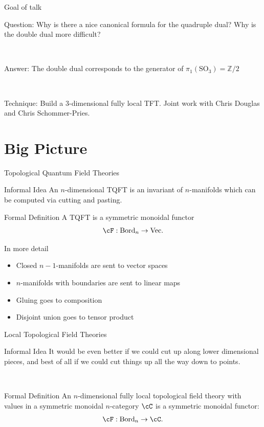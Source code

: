 \documentclass[beamer]{beamer}
\begin{document}
\begin{frame}{Goal of talk}
\begin{block}{Question:}
Why is there a nice canonical formula for the quadruple dual?  Why is the double dual more difficult?
\end{block}

\

\begin{block}{Answer:}
The double dual corresponds to the generator of $\pi_1(\mathrm{SO}_3) = \mathbb{Z}/2$
\end{block}

\

\begin{block}{Technique:}
Build a $3$-dimensional fully local TFT.  Joint work with Chris Douglas and Chris Schommer-Pries.
\end{block}
\end{frame}

\section{Big Picture}

\begin{frame}{Topological Quantum Field Theories}
\begin{block}{Informal Idea}
An $n$-dimensional TQFT is an invariant of $n$-manifolds which can be computed via cutting and pasting.
\end{block}

\begin{block}{Formal Definition}
A TQFT is a symmetric monoidal functor $$\cF:\mathrm{Bord}_n \rightarrow \mathrm{Vec}.$$
\end{block}


\begin{block}{In more detail}
\begin{itemize}
\item Closed $n-1$-manifolds are sent to vector spaces
\item $n$-manifolds with boundaries are sent to linear maps
\item Gluing goes to composition
\item Disjoint union goes to tensor product
\end{itemize}
\end{block}
\end{frame}

\begin{frame}{Local Topological Field Theories}
\begin{block}{Informal Idea}
It would be even better if we could cut up along lower dimensional pieces, and best of all if we could cut things up all the way down to points.
\end{block}

\

\begin{block}{Formal Definition}
An $n$-dimensional fully local topological field theory with values in a symmetric monoidal $n$-category $\cC$ is a symmetric monoidal functor:
$$\cF: \mathrm{Bord}_n \rightarrow \cC.$$
\end{block}
\end{frame}
\end{document}
